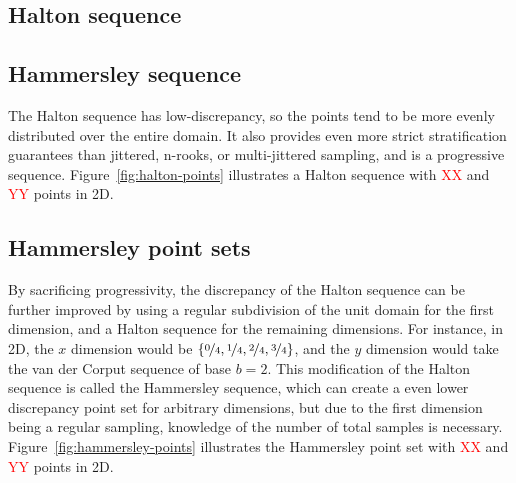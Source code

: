\documentclass[11pt,fleqn]{book} %
\newcommand{\TBC} {}
\begin{document}


\subsection{Halton sequence}
\TBC
\subsection{Hammersley sequence}
\TBC
%

%

The Halton sequence has low-discrepancy, so the points tend to be more evenly distributed over the entire domain. It also provides even more strict stratification guarantees than jittered, n-rooks, or multi-jittered sampling, and is a progressive sequence. Figure~\ref{fig:halton-points} illustrates a Halton sequence with \textcolor{red}{XX} and \textcolor{red}{YY} points in 2D.

\subsection{Hammersley point sets}
By sacrificing progressivity, the discrepancy of the Halton sequence can be further improved by using a regular subdivision of the unit domain for the first dimension, and a Halton sequence for the remaining dimensions. For instance, in 2D, the $x$ dimension would be $\left\{\nicefrac{0}{4}, \nicefrac{1}{4}, \nicefrac{2}{4}, \nicefrac{3}{4}\right\}$, and the $y$ dimension would take the van der Corput sequence of base $b=2$. This modification of the Halton sequence is called the Hammersley sequence, which can create a even lower discrepancy point set for arbitrary dimensions, but due to the first dimension being a regular sampling, knowledge of the number of total samples is necessary. Figure~\ref{fig:hammersley-points} illustrates the Hammersley point set with \textcolor{red}{XX} and \textcolor{red}{YY} points in 2D.
\end{document}
